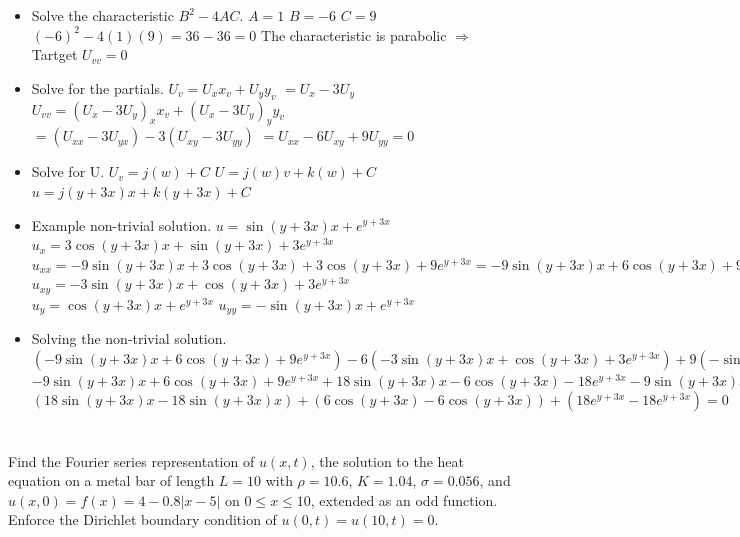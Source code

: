 \documentclass[10pt]{article}
\begin{document}
\begin{itemize}
    \item Solve the characteristic $ B^2 - 4AC $.
    \subitem $ A = 1 $
    \subitem $ B = -6 $
    \subitem $ C = 9 $
    \subitem $ (-6)^2 - 4(1)(9) = 36 - 36 = 0 $
    \subsubitem The characteristic is parabolic $ \Rightarrow  $ Tartget $ U_{vv} = 0 $
    \item Solve for the partials.
    \subitem $ U_{v} = U_{x}x_{v} + U_{y}y_{v} $
    \subsubitem $ = U_{x} - 3U_{y} $
    \subitem $ U_{vv} = (U_{x} - 3U_{y})_{x}x_{v} + (U_{x} - 3U_{y})_{y}y_{v} $
    \subsubitem $ = (U_{xx} - 3U_{yx}) - 3(U_{xy} - 3U_{yy}) $
    \subsubitem $ = U_{xx} - 6U_{xy} + 9U_{yy} = 0 $
    \item Solve for U.
    \subitem $ U_{v} = j(w) + C $
    \subitem $ U = j(w)v + k(w) + C $
    \subitem $ u = j(y + 3x)x + k(y + 3x) + C $
    \item Example non-trivial solution.
    \subitem $ u = \sin(y + 3x)x + e^{y + 3x} $
    \subitem $ u_{x} = 3\cos(y + 3x)x + \sin(y + 3x) + 3e^{y + 3x} $
    \subitem $ u_{xx} = -9\sin(y + 3x)x + 3\cos(y + 3x) + 3\cos(y + 3x) + 9e^{y + 3x} = -9\sin(y + 3x)x + 6\cos(y + 3x) + 9e^{y + 3x} $
    \subitem $ u_{xy} = -3\sin(y + 3x)x + \cos(y + 3x) + 3e^{y + 3x} $
    \subitem $ u_{y} = \cos(y + 3x)x + e^{y + 3x} $
    \subitem $ u_{yy} = -\sin(y + 3x)x + e^{y + 3x} $
    \item Solving the non-trivial solution.
    \subitem $ (-9\sin(y + 3x)x + 6\cos(y + 3x) + 9e^{y + 3x}) - 6(-3\sin(y + 3x)x + \cos(y + 3x) + 3e^{y + 3x}) + 9(-\sin(y + 3x)x + e^{y + 3x}) $
    \subitem $ -9\sin(y + 3x)x + 6\cos(y + 3x) + 9e^{y + 3x} + 18\sin(y + 3x)x - 6\cos(y + 3x) - 18e^{y + 3x} - 9\sin(y + 3x)x + 9e^{y + 3x} $ 
    \subitem $ (18\sin(y + 3x)x - 18\sin(y + 3x)x) + (6\cos(y + 3x) - 6\cos(y + 3x)) + (18e^{y + 3x} - 18e^{y + 3x}) = 0 $ 
\end{itemize}

\newpage

\section{\underline{}}
\label{sec: Problem 2}

\noindent
Find the Fourier series representation of $ u(x,t) $, 
the solution to the heat equation on a metal bar of length $ L = 10 $ 
with $ \rho = 10.6 $, $ K = 1.04 $, $ \sigma = 0.056 $, and $ u(x,0) = f(x) = 4 - 0.8|x-5| $ 
on $ 0 \le x \le 10 $, extended as an odd function. 
Enforce the Dirichlet boundary condition of $ u(0,t) = u(10,t) = 0 $. \\
\vspace{2.5mm}
\end{document}
